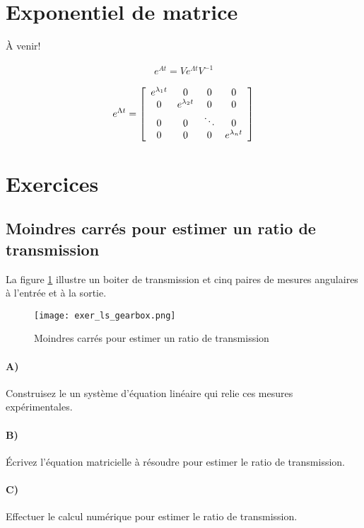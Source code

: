 \section{Exponentiel de matrice}

À venir!


\begin{align}
e^{At} = V e^{\Lambda t} V^{-1}
\end{align}

\begin{align}
e^{\Lambda t} = 
\left[ \begin{array}{c c c c}  
e^{\lambda_1 t} &  0          & 0 & 0 \\
0         &  e^{\lambda_2 t}  & 0      & 0 \\
0         &  0          &\ddots  & 0 \\
0         &  0          & 0  & e^{\lambda_n t}
\end{array} \right]
\end{align}

\newpage
\section{Exercices}

\subsection{Moindres carrés pour estimer un ratio de transmission}

La figure \ref{fig:exer_ls_gearbox} illustre un boiter de transmission et cinq paires de mesures angulaires à l'entrée et à la sortie. 
\begin{figure}[H]
	\centering
		\texttt{[image: exer\_ls\_gearbox.png]}
	\caption{Moindres carrés pour estimer un ratio de transmission}
	\label{fig:exer_ls_gearbox}
\end{figure}

\paragraph{A)}
Construisez le un système d'équation linéaire qui relie ces mesures expérimentales.

\paragraph{B)}
Écrivez l'équation matricielle à résoudre pour estimer le ratio de transmission.

\paragraph{C)}
Effectuer le calcul numérique pour estimer le ratio de transmission.
